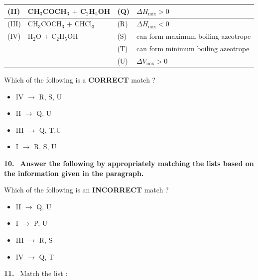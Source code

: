 \documentclass[10pt]{extarticle}
\newcommand{\qn}[1]{\par\smallskip\noindent\textbf{#1.}~}
\newenvironment{qoptions}{\begin{itemize}[leftmargin=1.8em,itemsep=1pt,topsep=2pt,label={}]}{\end{itemize}}
\newcommand{\opt}[2]{\item[(#1)] #2}
\begin{document}
\begin{multicols}{2}
{\begin{tabular}{|L{.95cm}|L{2.7cm}|L{.95cm}|L{3.1cm}|}
(II) & CH$_3$COCH$_3$ $+$ C$_2$H$_5$OH & (Q) & $\Delta H_{\text{mix}}>0$\\\hline
(III) & CH$_3$COCH$_3$ $+$ CHCl$_3$ & (R) & $\Delta H_{\text{mix}}<0$\\\hline
(IV) & H$_2$O $+$ C$_2$H$_5$OH & (S) & can form maximum boiling azeotrope\\\hline
 & & (T) & can form minimum boiling azeotrope\\\hline
 & & (U) & $\Delta V_{\text{mix}}>0$\\\hline
\end{tabular}}\par
\smallskip
Which of the following is a \textbf{CORRECT} match ?
\begin{qoptions}
\opt{A}{IV $\to$ R, S, U}
\opt{B}{II $\to$ Q, U}
\opt{C}{III $\to$ Q, T,U}
\opt{D}{I $\to$ R, S, U}
\end{qoptions}
\qn{10} \textbf{Answer the following by appropriately matching the lists based on the information given in the paragraph.}\par
\smallskip
{}\par
\smallskip
Which of the following is an \textbf{INCORRECT} match ?
\begin{qoptions}
\opt{A}{II $\to$ Q, U}
\opt{B}{I $\to$ P, U}
\opt{C}{III $\to$ R, S}
\opt{D}{IV $\to$ Q, T}
\end{qoptions}
\qn{11} Match the list :\par
\smallskip
{}
\end{multicols}
\end{document}

